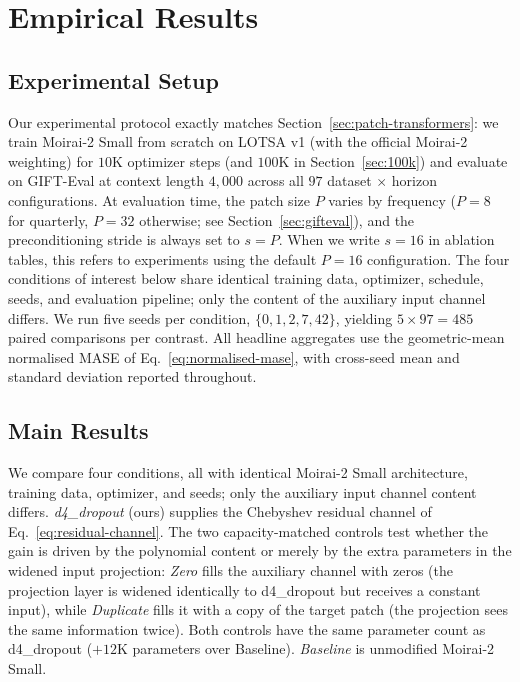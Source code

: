 \documentclass[11pt]{article}
\theoremstyle{plain}
\theoremstyle{definition}
\theoremstyle{remark}
\newcommand{\HD}{\textsf{d4\_dropout}}
\newcommand{\Baseline}{\textsf{Baseline}}
\newcommand{\Zero}{\textsf{Zero}}
\newcommand{\Dup}{\textsf{Duplicate}}
\begin{document}
\section{Empirical Results}
\label{sec:empirical}

\subsection{Experimental Setup}

Our experimental protocol exactly matches Section~\ref{sec:patch-transformers}: we train Moirai-2 Small from scratch on LOTSA v1 (with the official Moirai-2 weighting) for $10$K optimizer steps (and $100$K in Section~\ref{sec:100k}) and evaluate on GIFT-Eval at context length $4{,}000$ across all $97$ dataset $\times$ horizon configurations. At evaluation time, the patch size $P$ varies by frequency ($P = 8$ for quarterly, $P = 32$ otherwise; see Section~\ref{sec:gifteval}), and the preconditioning stride is always set to $s = P$. When we write $s = 16$ in ablation tables, this refers to experiments using the default $P = 16$ configuration. The four conditions of interest below share identical training data, optimizer, schedule, seeds, and evaluation pipeline; only the content of the auxiliary input channel differs. We run five seeds per condition, $\{0, 1, 2, 7, 42\}$, yielding $5 \times 97 = 485$ paired comparisons per contrast. All headline aggregates use the geometric-mean normalised MASE of Eq.~\eqref{eq:normalised-mase}, with cross-seed mean and standard deviation reported throughout.

\subsection{Main Results}
\label{sec:main-results}

We compare four conditions, all with identical Moirai-2 Small architecture, training data, optimizer, and seeds; only the auxiliary input channel content differs. \emph{\HD{}} (ours) supplies the Chebyshev residual channel of Eq.~\eqref{eq:residual-channel}. The two capacity-matched controls test whether the gain is driven by the polynomial content or merely by the extra parameters in the widened input projection: \emph{\Zero{}} fills the auxiliary channel with zeros (the projection layer is widened identically to \HD{} but receives a constant input), while \emph{\Dup{}} fills it with a copy of the target patch (the projection sees the same information twice). Both controls have the same parameter count as \HD{} ($+12$K parameters over \Baseline{}). \emph{\Baseline{}} is unmodified Moirai-2 Small.
\end{document}
